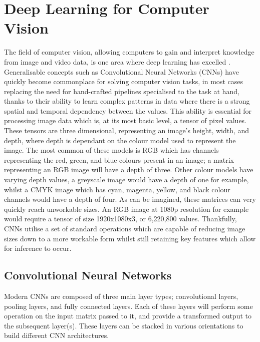 \section{Deep Learning for Computer Vision}\label{ch:Background,sec:DLforCV}

The field of computer vision, allowing computers to gain and interpret knowledge from image and video data, is one area where deep learning has excelled \cite{voulodimos_deep_2018}. Generalisable concepts such as Convolutional Neural Networks (CNNs) have quickly become commonplace for solving computer vision tasks, in most cases replacing the need for hand-crafted pipelines specialised to the task at hand, thanks to their ability to learn complex patterns in data where there is a strong spatial and temporal dependency between the values. This ability is essential for processing image data which is, at its most basic level, a tensor of pixel values. These tensors are three dimensional, representing an image's height, width, and depth, where depth is dependant on the colour model used to represent the image. The most common of these models is RGB which has channels representing the red, green, and blue colours present in an image; a matrix representing an RGB image will have a depth of three. Other colour models have varying depth values, a greyscale image would have a depth of one for example, whilst a CMYK image which has cyan, magenta, yellow, and black colour channels would have a depth of four. As can be imagined, these matrices can very quickly reach unworkable sizes. An RGB image at 1080p resolution for example would require a tensor of size 1920x1080x3, or 6,220,800 values. Thankfully, CNNs utilise a set of standard operations which are capable of reducing image sizes down to a more workable form whilst still retaining key features which allow for inference to occur. 

\subsection{Convolutional Neural Networks}\label{ch:Background,sec:CNN,sub:CNN}
Modern CNNs are composed of three main layer types; convolutional layers, pooling layers, and fully connected layers. Each of these layers will perform some operation on the input matrix passed to it, and provide a transformed output to the subsequent layer(s). These layers can be stacked in various orientations to build different CNN architectures.

